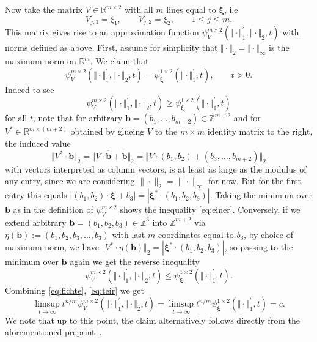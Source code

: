 \documentclass[10pt]{amsart}
\theoremstyle{definition}
\newcommand{\ux}{\boldsymbol{\xi}}
\newcommand{\uxs}{\boldsymbol{\xi}^{\ast}}
\newcommand{\bb}{\boldsymbol{b}}
\newcommand{\R}{\mathbb{R}}
\newcommand{\Z}{\mathbb{Z}}
\begin{document}
Now take the matrix $V\in \R^{m\times 2}$ with all $m$ lines equal to $\ux$, i.e.
\[
V_{j,1}= \xi_{1}, \qquad V_{j,2}=\xi_{2}, \qquad 1\leq j\le m.
\]
This matrix gives rise to an approximation function $\psi_{V}^{m\times 2}(\Vert\cdot\Vert_1^{\prime}, \Vert\cdot\Vert_2, t)$ with norms defined as above. First, assume for simplicity that 
$\Vert\cdot\Vert_2=\Vert\cdot\Vert_{\infty}$ is the maximum norm on $\R^m$.
We claim that
\begin{equation}  \label{eq:teir}
\psi_{V}^{m\times 2}(\Vert\cdot\Vert_1^{\prime}, \Vert\cdot\Vert_2, t)=\psi_{\ux}^{1\times 2}(\Vert\cdot\Vert_1^{\prime}, t), \qquad t>0.
\end{equation}
Indeed to see
\begin{equation} \label{eq:einer}
\psi_{V}^{m\times 2}(\Vert\cdot\Vert_1^{\prime}, \Vert\cdot\Vert_2, t)\ge \psi_{\ux}^{1\times 2}(\Vert\cdot\Vert_1^{\prime}, t)
\end{equation}
for all $t$, note that
for arbitrary $\bb=(b_1,\ldots,b_{m+2})\in\Z^{m+2}$ and for $V^{\ast}\in \R^{m\times (m+2)}$ obtained by glueing $V$ to the $m\times m$ identity matrix to the right, the induced value
\[
\Vert V^{\ast}\cdot \bb\Vert_2=
\Vert V\cdot \widehat{\bb}+ \tilde{\bb}\Vert_2=
\Vert V\cdot (b_1,b_{2}) + (b_{3},\ldots,b_{m+2})\Vert_2
\]
with vectors interpreted as 
column vectors, is at least
as large as the modulus of any entry, since we are considering $\|\cdot\|_{2}=\|\cdot\|_{\infty}$ for now. 
But for the first entry this equals $|(b_1,b_2)\cdot \ux +b_3|=| \uxs\cdot (b_1,b_2,b_3)|$. Taking the minimum over $\bb$  as in the definition of $\psi_V^{m\times 2}$ shows the inequality \eqref{eq:einer}.
Conversely, if we extend arbitrary $\bb=(b_1, b_2, b_3)\in\Z^3$ into $\Z^{m+2}$ via
$\eta(\bb):=(b_1,b_2,b_3,\ldots,b_{3})$ with last $m$ coordinates 
equal to $b_3$, 
by choice of maximum norm, we have
$\Vert V^{\ast}\cdot \eta(\bb)\Vert_2 = |\uxs \cdot (b_1,b_2,b_3)|$, so passing to the minimum
over $\bb$ again we get the reverse inequality
\begin{equation}  \label{eq:zweier}
\psi_{V}^{m\times 2}(\Vert\cdot\Vert_1^{\prime}, \Vert\cdot\Vert_2, t)\le \psi_{\ux}^{1\times 2}(\Vert\cdot\Vert_1^{\prime}, t).
\end{equation}
Combining \eqref{eq:fichte}, \eqref{eq:teir} we get
\[
\limsup_{t\to\infty} t^{n/m} \psi_{V}^{m\times2}(\Vert\cdot\Vert_1^{\prime}, \Vert\cdot\Vert_2, t)=\limsup_{t\to\infty} t^{n/m} \psi_{\ux}^{1\times 2}(\Vert\cdot\Vert_1^{\prime}, t)= c.
\]
We note that
up to this point, the claim alternatively follows directly from the aforementioned preprint~\cite[Corollary~1]{AginWeiss2024}. \par 
\end{document}
